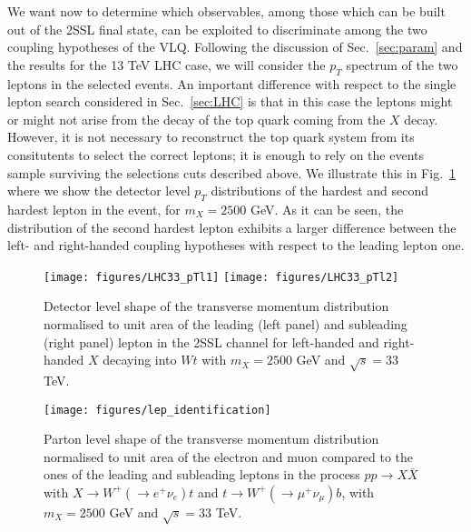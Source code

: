 \documentclass[a4paper]{article}
\begin{document}
We want now to determine which observables, among those which can be built out of the 2SSL final state, can be exploited to discriminate among the two coupling hypotheses of the VLQ. Following the discussion of Sec.~\ref{sec:param} and the results for the 13 TeV LHC case, we will consider the $p_T$ spectrum of the two leptons in the selected events. An important difference with respect to the single lepton search considered in Sec.~\ref{sec:LHC} is that in this case the leptons might or might not arise from the decay of the top quark coming from the $X$ decay. However, it is not necessary to reconstruct the top quark system from its consitutents to select the correct leptons; it is enough to rely on the events sample surviving the selections cuts described above.
We illustrate this in Fig.~\ref{fig:LHC33-detector} where we show the detector level $p_T$ distributions of the hardest and second hardest lepton in the event, for $m_{X}=2500$ GeV. As it can be seen, the distribution of the second hardest lepton exhibits a larger difference between the left- and right-handed coupling hypotheses with respect to the leading lepton one. 
\begin{figure}[!htbp]
\centering
\texttt{[image: figures/LHC33\_pTl1]}\hfill
\texttt{[image: figures/LHC33\_pTl2]}\hfill    
\caption{\label{fig:LHC33-detector} Detector level shape of the transverse momentum distribution normalised to unit area of the leading (left panel) and subleading (right panel) lepton in the 2SSL channel for left-handed and right-handed $X$ decaying into $Wt$ with $m_{X}=2500$ GeV and $\sqrt{s}=33$ TeV.}
\end{figure}
\begin{figure}[!htbp]
\centering
\texttt{[image: figures/lep\_identification]}\hfill
\caption{\label{fig:lep_identification_33} Parton level shape of the transverse momentum distribution normalised to unit area of the electron and muon compared to the ones of the leading and subleading leptons in the process $p p \to X \bar X_{}$ with $X\to W^+(\to e^+ \nu_e) t$ and $t \to W^+(\to \mu^+ \nu_\mu) b$, with $m_{X}=2500$ GeV and $\sqrt{s}=33$ TeV.}
\end{figure}
\end{document}
